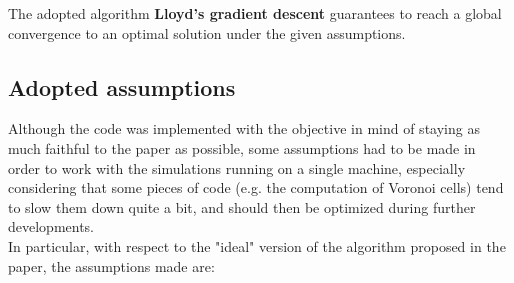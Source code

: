 \documentclass[a4paper,11pt,oneside]{book}
\begin{document}
	The adopted algorithm \textbf{Lloyd's gradient descent} guarantees to reach a global convergence to an optimal solution under the given assumptions.
	
	\subsection{Adopted assumptions}
	
	Although the code was implemented with the objective in mind of staying as much faithful to the paper as possible, some assumptions had to be made in order to work with the simulations running on a single machine, especially considering that some pieces of code (e.g. the computation of Voronoi cells) tend to slow them down quite a bit, and should then be optimized during further developments.\\ %
	
	In particular, with respect to the "ideal" version of the algorithm proposed in the paper\cite{K1}, the assumptions made are:
	
\end{document}
